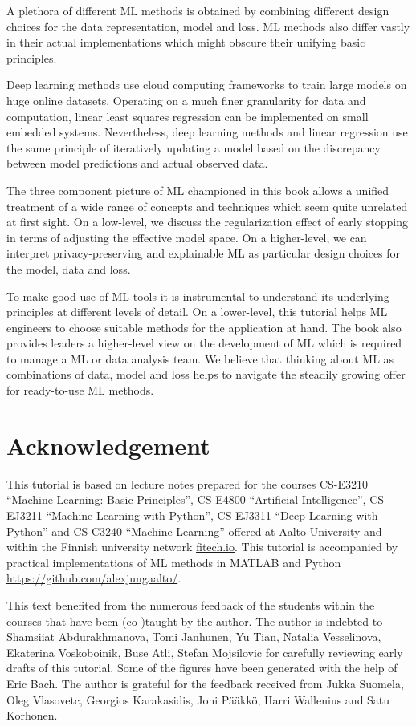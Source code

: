 \documentclass[12pt]{report}
\begin{document}
A plethora of different ML methods is obtained by combining different design 
choices for the data representation, model and loss. ML methods also differ 
vastly in their actual implementations which might obscure their unifying 
basic principles. 

Deep learning methods use cloud computing frameworks to train large 
models on huge online datasets. Operating on a much finer granularity 
for data and computation, linear least squares regression can be 
implemented on small embedded systems. Nevertheless, deep learning 
methods and linear regression use the same principle of iteratively 
updating a model based on the discrepancy between model predictions 
and actual observed data. 

The three component picture of ML championed in this book allows a 
unified treatment of a wide range of concepts and techniques 
which seem quite unrelated at first sight. On a low-level, we discuss 
the regularization effect of early stopping in terms of adjusting the effective 
model space. On a higher-level, we can interpret privacy-preserving 
and explainable ML as particular design choices for the model, data and loss. 

To make good use of ML tools it is instrumental to understand 
its underlying principles at different levels of detail. On a lower-level, 
this tutorial helps ML engineers to choose suitable methods for 
the application at hand. The book also provides leaders a 
higher-level view on the development of ML which is required 
to manage a ML or data analysis team. We believe that thinking 
about ML as combinations of data, model and loss helps to navigate 
the steadily growing offer for ready-to-use ML methods. 

\section*{Acknowledgement}
This tutorial is based on lecture notes prepared for the 
courses CS-E3210 ``Machine Learning: Basic Principles'', 
CS-E4800 ``Artificial Intelligence'', CS-EJ3211 ``Machine 
Learning with Python'', CS-EJ3311 ``Deep Learning with Python'' 
and CS-C3240 ``Machine Learning'' offered at Aalto 
University and within the Finnish university network 
\url{fitech.io}. This tutorial is accompanied by practical 
implementations of ML methods in MATLAB and 
Python \url{https://github.com/alexjungaalto/}. 

This text benefited from the numerous feedback of the 
students within the courses that have been (co-)taught 
by the author. The author is indebted to Shamsiiat Abdurakhmanova, 
Tomi Janhunen, Yu Tian, Natalia Vesselinova, Ekaterina Voskoboinik, 
Buse Atli, Stefan Mojsilovic for carefully reviewing early 
drafts of this tutorial. Some of the figures have been 
generated with the help of Eric Bach. The author is grateful 
for the feedback received from Jukka Suomela, Oleg Vlasovetc, 
Georgios Karakasidis, Joni P{\"a}{\"a}kk{\"o}, Harri Wallenius and 
Satu Korhonen. 
\end{document}
